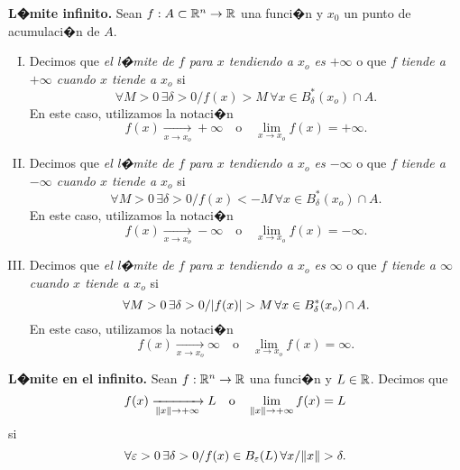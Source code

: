 \documentclass[a4paper]{scrartcl} %
\begin{document}
\begin{definition}\textbf{L�mite infinito.} \label{def:lim_inf}
  Sean $f : A \subset \mathbb{R}^n \to \mathbb{R}$ una funci�n y $x_0$ un punto de acumulaci�n de $A$. 
  \begin{enumerate} [I.]
   \item Decimos que \emph{el l�mite de $f$ para $x$ tendiendo a $x_o$ es $+\infty$} o que \emph{$f$ tiende a $+\infty$ cuando $x$ tiende a $x_o$} si
    \[
      \forall M > 0 \, \exists \delta > 0 / f(x) > M \, \forall 
	  x \in B_{\delta}^*(x_o) \cap A.
    \]
    En este caso, utilizamos la notaci�n
    \[
      f(x) \xrightarrow[x \to x_o]{} +\infty \quad \text{o} \quad \lim_{x \to x_o} f(x) = +\infty.
    \]
   \item Decimos que \emph{el l�mite de $f$ para $x$ tendiendo a $x_o$ es $-\infty$} o que \emph{$f$ tiende a $-\infty$ cuando $x$ tiende a $x_o$} si
    \[
      \forall M > 0 \, \exists \delta > 0 / f(x) < -M \, \forall 
	  x \in B_{\delta}^*(x_o) \cap A.
    \]
    En este caso, utilizamos la notaci�n
    \[
      f(x) \xrightarrow[x \to x_o]{} -\infty \quad \text{o} \quad \lim_{x \to x_o} f(x) = -\infty.
    \]
   \item Decimos que \emph{el l�mite de $f$ para $x$ tendiendo a $x_o$ es $\infty$} o que \emph{$f$ tiende a $\infty$ cuando $x$ tiende a $x_o$} si
    \[
      \forall M > 0 \, \exists \delta > 0 / \abs{f(x)} > M \, \forall 
	  x \in B_{\delta}^*(x_o) \cap A.
    \]
    En este caso, utilizamos la notaci�n
    \[
      f(x) \xrightarrow[x \to x_o]{} \infty \quad \text{o} \quad \lim_{x \to x_o} f(x) = \infty.
    \]
  \end{enumerate}
\end{definition}

\begin{definition}\textbf{L�mite en el infinito.} \label{def:lim_x_inf}
Sean $f : \mathbb{R}^n \to \mathbb{R}$ una funci�n y $L \in \mathbb{R}$. Decimos que
\[
 f(x) \xrightarrow[\norm{x} \to +\infty]{} L \quad \text{o} \quad \lim_{\norm{x} \to +\infty} f(x) = L
\]
si 
\[ 
 \forall \varepsilon > 0 \, \exists \delta > 0 / f(x) \in B_{\varepsilon}(L) \, \forall 
 x / \norm{x} > \delta.
\]
\end{definition}


\iffalse
\begin{propiedad} \label{prop:lim_2}
 Sean $f:A \subset \Rn{m} \to \Rn{m}$, $g:A \to \R$ y $x_0$ un punto de acumulaci�n de $A$, tales que 
 \[
  \lim_{x \to x_o} g(x) = L_g \quad \wedge \quad \lim_{x \to x_o} \left( (f + g)_{(x)} \right) = L.
 \]
 Entonces, existe el l�mite $\lim_{x \to x_o} f(x)$ y, adem�s, $\lim_{x \to x_o} f(x) = L - L_g$.
\end{propiedad}
\fi
\end{document}
